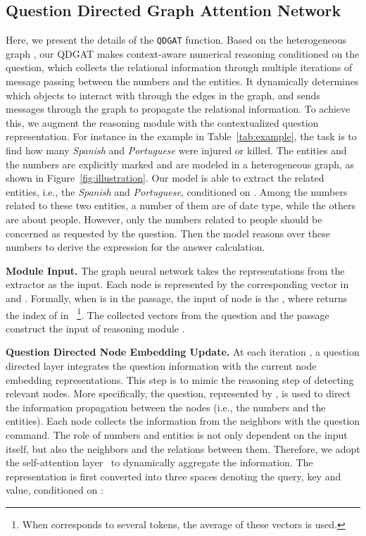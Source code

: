 \documentclass{article}
\begin{document}
\subsection{Question Directed Graph Attention Network}
Here, we present the details of the \texttt{QDGAT} function.
Based on the heterogeneous graph , our QDGAT makes context-aware numerical reasoning conditioned on the question, which collects the relational information through multiple iterations of message passing between the numbers and the entities.
It dynamically determines which objects to interact with through the edges in the graph, and sends messages through the graph to propagate the relational information.
To achieve this, we augment the reasoning module with the contextualized question representation.
For instance in the example in Table~\ref{tab:example}, the task is to find how many \emph{Spanish} and \emph{Portuguese} were injured or killed.
The entities and the numbers are explicitly marked and are modeled in a heterogeneous graph, as shown in Figure~\ref{fig:illustration}. 
Our model is able to extract the related entities, i.e., the \emph{Spanish} and \emph{Portuguese}, conditioned on .
Among the numbers related to these two entities, a number of them are of date type, while the others are about people.
However, only the numbers related to people should be concerned as requested by the question. 
Then the model reasons over these numbers to derive the expression for the answer calculation.


{\bf Module Input.}
The graph neural network takes the representations from the extractor as the input.
Each node is represented by the corresponding vector in  and . 
Formally, when  is in the passage, the input of node  is the , where  returns the index of  in ~\footnote{When  corresponds to several tokens, the average of these vectors is used.}.
The collected vectors from the question and the passage construct the input of reasoning module .

{\bf Question Directed Node Embedding Update.}
At each iteration , a question directed layer integrates the question information with the current node embedding representations. This step is to mimic the reasoning step of detecting relevant nodes. More specifically, the question, represented by , is used to direct the information propagation between the nodes (i.e., the numbers and the entities).
Each node collects the information from the neighbors with the question command.
The role of numbers and entities is not only dependent on the input itself, but also the neighbors and the relations between them.
Therefore, we adopt the self-attention layer~\cite{vaswani2017attention} to dynamically aggregate the information.
The representation is first converted into three spaces denoting the query, key and value, conditioned on :
\end{document}

